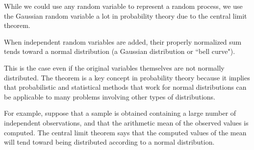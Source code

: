 While we could use any random variable to represent a random process, we use the
Gaussian random variable a lot in probability theory due to the central limit
theorem.

\begin{definition}
  When independent random variables are added, their properly normalized sum
  tends toward a normal distribution (a Gaussian distribution or ``bell curve").
\end{definition}

This is the case even if the original variables themselves are not normally
distributed. The theorem is a key concept in probability theory because it
implies that probabilistic and statistical methods that work for normal
distributions can be applicable to many problems involving other types of
distributions.

For example, suppose that a sample is obtained containing a large number of
independent observations, and that the arithmetic mean of the observed values
is computed. The central limit theorem says that the computed values of the
mean will tend toward being distributed according to a normal distribution.
